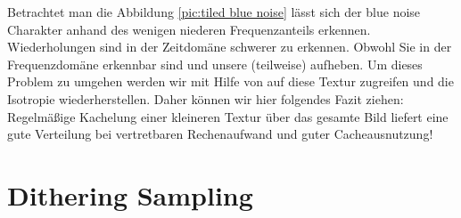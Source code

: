 Betrachtet man die Abbildung \ref{pic:tiled blue noise} lässt sich der blue noise Charakter anhand des
wenigen niederen Frequenzanteils erkennen. Wiederholungen sind in der Zeitdomäne schwerer zu erkennen. 
Obwohl Sie in der Frequenzdomäne erkennbar sind und unsere 
(teilweise) aufheben. Um dieses Problem zu umgehen werden wir mit Hilfe von 
auf diese Textur zugreifen und die Isotropie wiederherstellen.
Daher können wir hier folgendes Fazit ziehen: Regelmäßige Kachelung einer kleineren  Textur 
über das gesamte Bild liefert eine gute  Verteilung bei vertretbaren Rechenaufwand und guter 
Cacheausnutzung!

\section{Dithering Sampling}
\label{ch:Content1:sec:blue noise sampling}

